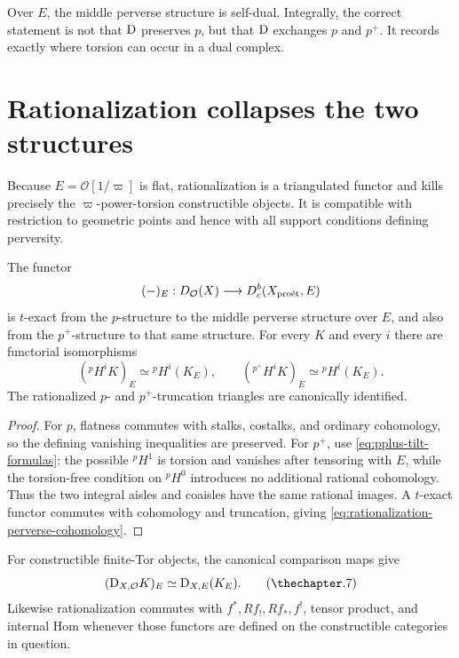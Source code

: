 \begin{powerbox}
Over \(E\), the middle perverse structure is self-dual.  Integrally, the
correct statement is not that \(\mathrm D\) preserves \(p\), but that \(\mathrm D\)
exchanges \(p\) and \(p^+\).  It records exactly where torsion can occur in a
dual complex.
\end{powerbox}

\section{Rationalization collapses the two structures}

Because \(E=\mathcal O[1/\varpi]\) is flat, rationalization is a triangulated
functor and kills precisely the \(\varpi\)-power-torsion constructible
objects.  It is compatible with restriction to geometric points and hence
with all support conditions defining perversity.

\begin{theorem}
\label{thm:rationalization-perverse}
The functor
\[
  (-)_E:D_{\mathcal O}(X)\longrightarrow D^b_c(X_{\mathrm{pro\acute et}},E)
\]
is \(t\)-exact from the \(p\)-structure to the middle perverse structure
over \(E\), and also from the \(p^+\)-structure to that same structure.  For
every \(K\) and every \(i\) there are functorial isomorphisms
\[
  ({}^pH^iK)_E\simeq{}^pH^i(K_E),\qquad
  ({}^{p^+}H^iK)_E\simeq{}^pH^i(K_E).
\tag{\thechapter.6}\label{eq:rationalization-perverse-cohomology}
\]
The rationalized \(p\)- and \(p^+\)-truncation triangles are canonically
identified.
\end{theorem}

\begin{proof}
For \(p\), flatness commutes with stalks, costalks, and ordinary cohomology,
so the defining vanishing inequalities are preserved.  For \(p^+\), use
\eqref{eq:pplus-tilt-formulas}: the possible \({}^pH^1\) is torsion and
vanishes after tensoring with \(E\), while the torsion-free condition on
\({}^pH^0\) introduces no additional rational cohomology.  Thus the two
integral aisles and coaisles have the same rational images.  A \(t\)-exact
functor commutes with cohomology and truncation, giving
\eqref{eq:rationalization-perverse-cohomology}.
\end{proof}

\begin{proposition}
\label{prop:rationalization-six-duality}
For constructible finite-Tor objects, the canonical comparison maps give
\[
  (\D_{X,\mathcal O}K)_E\simeq\D_{X,E}(K_E).
\tag{\thechapter.7}\label{eq:rationalization-duality}
\]
Likewise rationalization commutes with \(f^*,Rf_!,Rf_*,f^!\), tensor
product, and internal Hom whenever those functors are defined on the
constructible categories in question.
\end{proposition}

